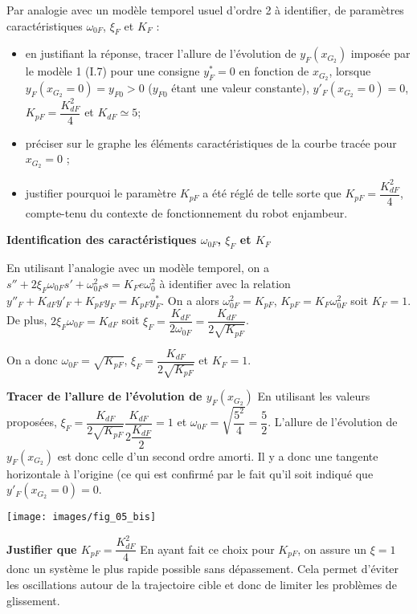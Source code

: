 \documentclass[11pt]{article}
\begin{document}

\UPSTIquestion Par analogie avec un modèle temporel usuel d’ordre 2 à identifier, de paramètres caractéristiques $\omega_{0F}$, $\xi_F$ et $K_F$ :
\begin{itemize}
\item en justifiant la réponse, tracer l’allure de l’évolution de  $y_F\left(x_{G_2}\right)$  imposée par le modèle 1 (I.7) pour une consigne $y_F^*=0$ en fonction de $x_{G_2}$, lorsque $y_F\left(x_{G_2}=0\right)=y_{F0}>0$
 ($y_{F0}$ étant une valeur constante), $y'_F\left(x_{G_2}=0\right)=0$, $K_{pF}=\dfrac{K^2_{dF}}{4}$ et $K_{dF}\simeq 5$; 
 \item préciser sur le graphe les éléments caractéristiques de la courbe tracée pour $x_{G_2}=0$ ;
\item justifier pourquoi le paramètre $K_{pF}$ a été réglé de telle sorte que $K_{pF}=\dfrac{K^2_{dF}}{4}$, compte-tenu du contexte de fonctionnement du robot enjambeur.
\end{itemize}

\begin{UPSTIcorrige}

\textbf{Identification des  caractéristiques $\omega_{0F}$, $\xi_F$ et $K_F$}

En utilisant l'analogie avec un modèle temporel, on a $s'' + 2\xi_F\omega_{0F} s' + \omega_{0F}^2 s = K_Fe\omega_0^2$ à identifier avec la relation $y''_F+K_{dF}y'_F+K_{pF}y_F=K_{pF}y^*_F$.
On a alors  $\omega_{0F}^2 =K_{pF}$, $K_{pF} = K_F\omega_{0F}^2$ soit $K_F=1$. De plus, $2\xi_F\omega_{0F} = K_{dF}$ soit $\xi_F = \dfrac{K_{dF}}{2\omega_{0F}}= \dfrac{K_{dF}}{2\sqrt{K_{pF}}}$.

On a donc $\omega_{0F}=\sqrt{K_{pF}}$, $\xi_F=\dfrac{K_{dF}}{2\sqrt{K_{pF}}} $ et $K_F=1$.


\textbf{Tracer de l’allure de l’évolution de  $y_F\left(x_{G_2}\right)$}
En utilisant les valeurs proposées, $\xi_F=\dfrac{K_{dF}}{2\sqrt{K_{pF}}}\dfrac{K_{dF}}{2\dfrac{K_{dF}}{2}} =1 $ et $\omega_{0F}=\sqrt{\dfrac{5^2}{4}}=\dfrac{5}{2}$. L'allure de l'évolution de $y_F\left(x_{G_2}\right)$ est donc celle d'un second ordre amorti. Il y a donc une tangente horizontale à l'origine (ce qui est confirmé par le fait qu'il soit indiqué que $y'_F\left(x_{G_2}=0\right)=0$.

\begin{center}
\texttt{[image: images/fig\_05\_bis]}
\end{center}
\textbf{Justifier que $K_{pF}=\dfrac{K^2_{dF}}{4}$}
En ayant fait ce choix pour $K_{pF}$, on assure un $\xi=1$ donc un système le plus rapide possible sans dépassement. 
Cela permet d'éviter les oscillations autour de la trajectoire cible et donc de limiter les problèmes de glissement. 

\end{UPSTIcorrige}
\end{document}

